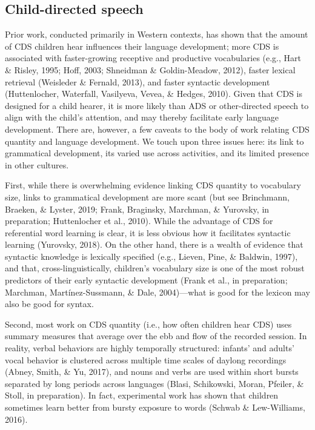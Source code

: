 \documentclass[,man,floatsintext]{apa6}
\begin{document}
\subsection{Child-directed speech}\label{intro-cds}

Prior work, conducted primarily in Western contexts, has shown that the
amount of CDS children hear influences their language development; more
CDS is associated with faster-growing receptive and productive
vocabularies (e.g., Hart \& Risley, 1995; Hoff, 2003; Shneidman \&
Goldin-Meadow, 2012), faster lexical retrieval (Weisleder \& Fernald,
2013), and faster syntactic development (Huttenlocher, Waterfall,
Vasilyeva, Vevea, \& Hedges, 2010). Given that CDS is designed for a
child hearer, it is more likely than ADS or other-directed speech to
align with the child's attention, and may thereby facilitate early
language development. There are, however, a few caveats to the body of
work relating CDS quantity and language development. We touch upon three
issues here: its link to grammatical development, its varied use across
activities, and its limited presence in other cultures.

First, while there is overwhelming evidence linking CDS quantity to
vocabulary size, links to grammatical development are more scant (but
see Brinchmann, Braeken, \& Lyster, 2019; Frank, Braginsky, Marchman, \&
Yurovsky, in preparation; Huttenlocher et al., 2010). While the
advantage of CDS for referential word learning is clear, it is less
obvious how it facilitates syntactic learning (Yurovsky, 2018). On the
other hand, there is a wealth of evidence that syntactic knowledge is
lexically specified (e.g., Lieven, Pine, \& Baldwin, 1997), and that,
cross-linguistically, children's vocabulary size is one of the most
robust predictors of their early syntactic development (Frank et al., in
preparation; Marchman, Martínez-Sussmann, \& Dale, 2004)---what is good
for the lexicon may also be good for syntax.

Second, most work on CDS quantity (i.e., how often children hear CDS)
uses summary measures that average over the ebb and flow of the recorded
session. In reality, verbal behaviors are highly temporally structured:
infants' and adults' vocal behavior is clustered across multiple time
scales of daylong recordings (Abney, Smith, \& Yu, 2017), and nouns and
verbs are used within short bursts separated by long periods across
languages (Blasi, Schikowski, Moran, Pfeiler, \& Stoll, in preparation).
In fact, experimental work has shown that children sometimes learn
better from bursty exposure to words (Schwab \& Lew-Williams, 2016).
\end{document}
